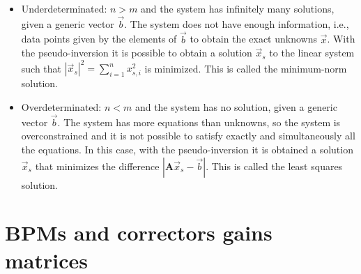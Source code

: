 \begin{itemize}
    \item Underdeterminated: $n > m$ and the system has infinitely many solutions, given a generic vector $\vec{b}$. The system does not have enough information, i.e., data points given by the elements of $\vec{b}$ to obtain the exact unknowns $\vec{x}$. With the pseudo-inversion it is possible to obtain a solution $\vec{x}_s$ to the linear system such that $|\vec{x}_s|^2 = \sum_{i=1}^{n}x^2_{s, i}$ is minimized. This is called the minimum-norm solution.
    
    \item Overdeterminated: $n < m$ and the system has no solution, given a generic vector $\vec{b}$. The system has more equations than unknowns, so the system is overconstrained and it is not possible to satisfy exactly and simultaneously all the equations. In this case, with the pseudo-inversion it is obtained a solution $\vec{x}_s$ that minimizes the difference $|\mathbf{A}\vec{x}_s - \vec{b}|$. This is called the least squares solution.
\end{itemize}









\chapter{BPMs and correctors gains matrices}\label{appendix:gains}